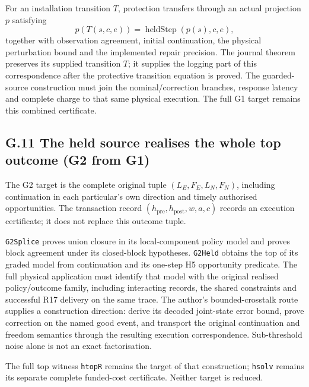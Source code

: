 \documentclass[
]{article}
\begin{document}
For an installation transition \(T\), protection transfers through an
actual projection \(p\) satisfying \[
p(T(s,c,e))=\operatorname{heldStep}(p(s),c,e),
\] together with observation agreement, initial continuation, the
physical perturbation bound and the implemented repair precision. The
journal theorem preserves its supplied transition \(T\); it supplies the
logging part of this correspondence after the protective transition
equation is proved. The guarded-source construction must join the
n\allowbreak{}o\allowbreak{}m\allowbreak{}i\allowbreak{}n\allowbreak{}a\allowbreak{}l\allowbreak{}/\allowbreak{}c\allowbreak{}o\allowbreak{}r\allowbreak{}r\allowbreak{}e\allowbreak{}c\allowbreak{}t\allowbreak{}i\allowbreak{}o\allowbreak{}n
branches, response latency and complete charge to that same physical
execution. The full G1 target remains this combined certificate.

\subsection{G.11 The held source realises the whole top outcome (G2 from
G1)}\label{g.11-the-held-source-realises-the-whole-top-outcome-g2-from-g1}

The G2 target is the complete original tuple \((L_E,F_E,L_N,F_N)\),
including continuation in each particular's own direction and timely
authorised opportunities. The transaction record
\((h_{\mathrm{pre}},h_{\mathrm{post}},w,a,c)\) records an execution
certificate; it does not replace this outcome tuple.

\texttt{G2Splice} proves union closure in its local-component policy
model and proves block agreement under its closed-block hypotheses.
\texttt{G2Held} obtains the top of its graded model from continuation
and its one-step H5 opportunity predicate. The full physical application
must identify that model with the original realised policy/outcome
family, including interacting records, the shared constraints and
successful R17 delivery on the same trace. The author's
bounded-crosstalk route supplies a construction direction: derive its
decoded joint-state error bound, prove correction on the named good
event, and transport the original continuation and freedom semantics
through the resulting execution correspondence. Sub-threshold noise
alone is not an exact factorisation.

The full top witness \texttt{htopR} remains the target of that
construction; \texttt{hsolv} remains its separate complete funded-cost
certificate. Neither target is reduced.
\end{document}
